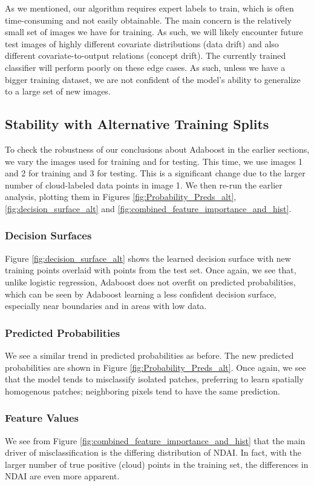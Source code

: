 \documentclass[11pt, letterpaper, journal]{IEEEtran}
\begin{document}
As we mentioned, our algorithm requires expert labels to train, which is often time-consuming and not easily obtainable. The main concern is the relatively small set of images we have for training. As such, we will likely encounter future test images of highly different covariate distributions (data drift) and also different covariate-to-output relations (concept drift). The currently trained classifier will perform poorly on these edge cases. As such, unless we have a bigger training dataset, we are not confident of the model's ability to generalize to a large set of new images.

\subsection{Stability with Alternative Training Splits}
To check the robustness of our conclusions about Adaboost in the earlier sections, we vary the images used for training and for testing. This time, we use images 1 and 2 for training and 3 for testing. This is a significant change due to the larger number of cloud-labeled data points in image 1. We then re-run the earlier analysis, plotting them in Figures \ref{fig:Probability_Preds_alt}, \ref{fig:decision_surface_alt} and \ref{fig:combined_feature_importance_and_hist}.

\subsubsection{Decision Surfaces}
Figure \ref{fig:decision_surface_alt} shows the learned decision surface with new training points overlaid with points from the test set. Once again, we see that, unlike logistic regression, Adaboost does not overfit on predicted probabilities, which can be seen by Adaboost learning a less confident decision surface, especially near boundaries and in areas with low data. 
\subsubsection{Predicted Probabilities}
We see a similar trend in predicted probabilities as before. The new predicted probabilities are shown in Figure \ref{fig:Probability_Preds_alt}. Once again, we see that the model tends to misclassify isolated patches, preferring to learn spatially homogenous patches; neighboring pixels tend to have the same prediction.
\subsubsection{Feature Values}
We see from Figure \ref{fig:combined_feature_importance_and_hist} that the main driver of misclassification is the differing distribution of NDAI. In fact, with the larger number of true positive (cloud) points in the training set, the differences in NDAI are even more apparent. 
\end{document}
